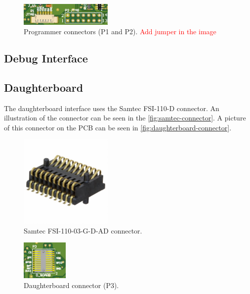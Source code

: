 \begin{figure}[!ht]
    \begin{center}
        \includegraphics[width=0.4\textwidth]{figures/jtag-connector.png}
        \caption{Programmer connectors (P1 and P2). \textcolor{red}{Add jumper in the image}}
        \label{fig:jtag-connectors}
    \end{center}
\end{figure}

\subsection{Debug Interface}



\subsection{Daughterboard}

The daughterboard interface uses the Samtec FSI-110-D connector. An illustration of the connector can be seen in the \autoref{fig:samtec-connector}. A picture of this connector on the PCB can be seen in \autoref{fig:daughterboard-connector}.

\begin{figure}[!ht]
    \begin{center}
        \includegraphics[width=0.4\textwidth]{figures/samtec_fsi-110-03-g-d-ad.jpeg}
        \caption{Samtec FSI-110-03-G-D-AD connector.}
        \label{fig:samtec-connector}
    \end{center}
\end{figure}

\begin{figure}[!ht]
    \begin{center}
        \includegraphics[width=0.2\textwidth]{figures/p3-connector.png}
        \caption{Daughterboard connector (P3).}
        \label{fig:daughterboard-connector}
    \end{center}
\end{figure}

